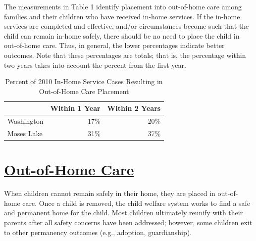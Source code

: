 \documentclass{article}\usepackage[]{graphicx}\usepackage[]{color}
\begin{document}
The measurements in Table 1 identify placement into out-of-home care among families and their children who have received in-home services. If the in-home services are completed and effective, and/or circumstances become such that the child can remain in-home safely, there should be no need to place the child in out-of-home care. Thus, in general, the lower percentages indicate better outcomes. Note that these percentages are totals; that is, the percentage within two years takes into account the percent from the first year.
\vspace{12pt}
\begin{table}[ht]
\centering
\caption{Percent of 2010 In-Home Service Cases Resulting in Out-of-Home Care Placement} 
\begin{tabular}{lrr}
  \toprule
 & Within 1 Year & Within 2 Years \\ 
  \midrule
Washington & 17\% & 20\% \\ 
  Moses Lake & 31\% & 37\% \\ 
   \bottomrule
\end{tabular}
\end{table}



\newpage
\section{\href{http://www.partnersforourchildren.org/child-well-being/visualizations/out-home-care/trends}
    {Out-of-Home Care}
}
When children cannot remain safely in their home, they are placed in out-of-home care. Once a child is removed, the child welfare system works to find a safe and permanent home for the child. Most children ultimately reunify with their parents after all safety concerns have been addressed; however, some children exit to other permanency outcomes (e.g., adoption, guardianship).\\[6pt]

\label{p:ooh}
\end{document}
